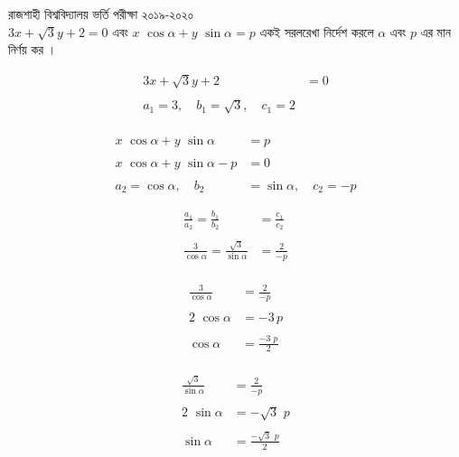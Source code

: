 \documentclass{article}
\begin{document}
	রাজশাহী বিশ্ববিদ্যালয় ভর্তি পরীক্ষা ২০১৯-২০২০\\
	$3x+\sqrt{3}y+2=0$ এবং $x\,\,\cos \alpha+ y\,\,\sin \alpha=p$ একই সরলরেখা নির্দেশ করলে $\alpha$ এবং  $p$ এর মান নির্ণয় কর ।\\  
	\begin{multicols}{2}
		\begin{align*}
		3x+\sqrt{3}y+2&=0\\
		\\
		a_1=3,\quad b_1=\sqrt{3},\quad c_1=2
	\end{align*}
	\\
	\begin{align*}
		x\,\,\cos \alpha+ y\,\,\sin \alpha&=p\\
		\\
		x\,\,\cos \alpha+ y\,\,\sin \alpha-p&=0\\
		\\
		a_2=\cos \alpha,\quad b_2&=\sin \alpha,\quad c_2=-p
	\end{align*}
	\end{multicols}
\begin{align*}
	\frac{a_1}{a_2}=\frac{b_1}{b_2}&=\frac{c_1}{c_2}\\
	\\
	\frac{3}{\cos \alpha}=\frac{\sqrt{3}}{\sin \alpha}&=\frac{2}{-p}\\
\end{align*}
\begin{multicols}{2}
\begin{align*}
	\frac{3}{\cos \alpha}&=\frac{2}{-p}\\
	\\
	2\,\,\cos \alpha&=-3\,p\\
	\\
	\cos \alpha&=\frac{-3\,\,p}{2}
\end{align*}
\\
\begin{align*}
	\frac{\sqrt{3}}{\sin \alpha}&=\frac{2}{-p}\\
	\\
	2\,\,\sin \alpha&=-\sqrt{3}\,\,p\\
	\\
	\sin \alpha&=\frac{-\sqrt{3}\,\,p}{2}
\end{align*}
\end{multicols}
\end{document}
